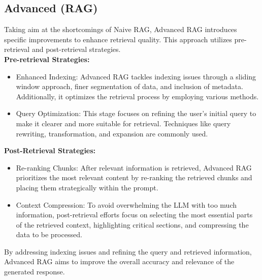 \subsection{Advanced (RAG)}
Taking aim at the shortcomings of Naive RAG, Advanced RAG introduces specific improvements to enhance retrieval quality. This approach utilizes pre-retrieval and post-retrieval strategies.\\
\textbf{Pre-retrieval Strategies:}
\begin{itemize}
	\item Enhanced Indexing: Advanced RAG tackles indexing issues through a sliding window approach, finer segmentation of data, and inclusion of metadata. Additionally, it optimizes the retrieval process by employing various methods.
	\item Query Optimization: This stage focuses on refining the user's initial query to make it clearer and more suitable for retrieval. Techniques like query rewriting, transformation, and expansion are commonly used.
\end{itemize}
\textbf{Post-Retrieval Strategies:}
\begin{itemize}
	\item Re-ranking Chunks: After relevant information is retrieved, Advanced RAG prioritizes the most relevant content by re-ranking the retrieved chunks and placing them strategically within the prompt.
	\item Context Compression: To avoid overwhelming the LLM with too much information, post-retrieval efforts focus on selecting the most essential parts of the retrieved context, highlighting critical sections, and compressing the data to be processed.
\end{itemize}
By addressing indexing issues and refining the query and retrieved information, Advanced RAG aims to improve the overall accuracy and relevance of the generated response.
